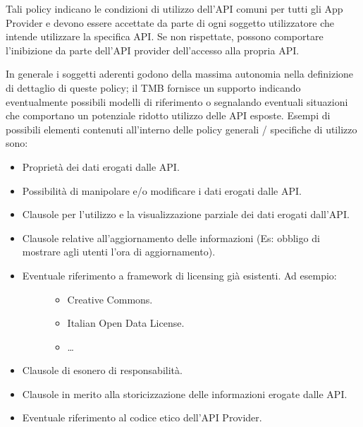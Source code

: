 \documentclass[letterpaper,10pt,italian]{sphinxmanual}
\begin{document}
Tali policy indicano le condizioni di utilizzo dell’API comuni per tutti gli App Provider e devono essere accettate da parte di ogni soggetto utilizzatore che intende utilizzare la specifica API.
Se non rispettate, possono comportare l’inibizione da parte dell’API provider dell’accesso alla propria API.

In generale i soggetti aderenti godono della massima autonomia nella definizione di dettaglio di queste policy; il TMB fornisce un supporto indicando eventualmente possibili modelli di riferimento o segnalando eventuali situazioni che comportano un potenziale ridotto utilizzo delle API esposte. Esempi di possibili elementi contenuti all’interno delle policy generali / specifiche di utilizzo sono:
\begin{itemize}
\item {} 
Proprietà dei dati erogati dalle API.

\item {} 
Possibilità di manipolare e/o modificare i dati erogati dalle API.

\item {} 
Clausole per l’utilizzo e la visualizzazione parziale dei dati erogati dall’API.

\item {} 
Clausole relative all’aggiornamento delle informazioni (Es: obbligo di mostrare agli utenti l’ora di aggiornamento).

\item {} \begin{description}
\item[{Eventuale riferimento a framework di licensing già esistenti. Ad esempio:}] \leavevmode\begin{itemize}
\item {} 
Creative Commons.

\item {} 
Italian Open Data License.

\item {} 
…

\end{itemize}

\end{description}

\item {} 
Clausole di esonero di responsabilità.

\item {} 
Clausole in merito alla storicizzazione delle informazioni erogate dalle API.

\item {} 
Eventuale riferimento al codice etico dell’API Provider.


\end{itemize}
\end{document}
